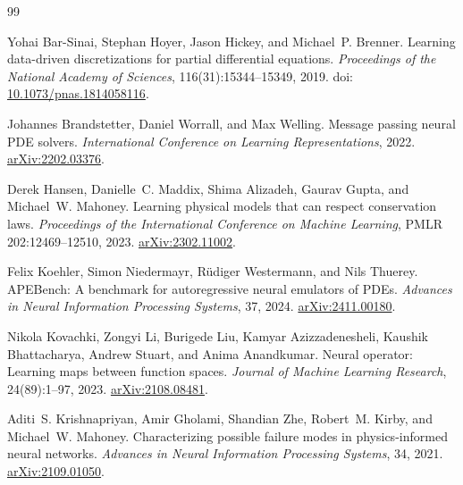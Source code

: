 \begin{thebibliography}{99}

Yohai Bar-Sinai, Stephan Hoyer, Jason Hickey, and Michael~P. Brenner.
Learning data-driven discretizations for partial differential equations.
\emph{Proceedings of the National Academy of Sciences}, 116(31):15344--15349, 2019.
doi: \href{https://doi.org/10.1073/pnas.1814058116}{10.1073/pnas.1814058116}.

Johannes Brandstetter, Daniel Worrall, and Max Welling.
Message passing neural PDE solvers.
\emph{International Conference on Learning Representations}, 2022.
\href{https://arxiv.org/abs/2202.03376}{arXiv:2202.03376}.

Derek Hansen, Danielle~C. Maddix, Shima Alizadeh, Gaurav Gupta, and Michael~W. Mahoney.
Learning physical models that can respect conservation laws.
\emph{Proceedings of the International Conference on Machine Learning},
PMLR 202:12469--12510, 2023. \href{https://arxiv.org/abs/2302.11002}{arXiv:2302.11002}.

Felix Koehler, Simon Niedermayr, R\"udiger Westermann, and Nils Thuerey.
APEBench: A benchmark for autoregressive neural emulators of PDEs.
\emph{Advances in Neural Information Processing Systems}, 37, 2024.
\href{https://arxiv.org/abs/2411.00180}{arXiv:2411.00180}.

Nikola Kovachki, Zongyi Li, Burigede Liu, Kamyar Azizzadenesheli,
Kaushik Bhattacharya, Andrew Stuart, and Anima Anandkumar.
Neural operator: Learning maps between function spaces.
\emph{Journal of Machine Learning Research}, 24(89):1--97, 2023.
\href{https://arxiv.org/abs/2108.08481}{arXiv:2108.08481}.

Aditi~S. Krishnapriyan, Amir Gholami, Shandian Zhe, Robert~M. Kirby, and Michael~W. Mahoney.
Characterizing possible failure modes in physics-informed neural networks.
\emph{Advances in Neural Information Processing Systems}, 34, 2021.
\href{https://arxiv.org/abs/2109.01050}{arXiv:2109.01050}.


\end{thebibliography}
